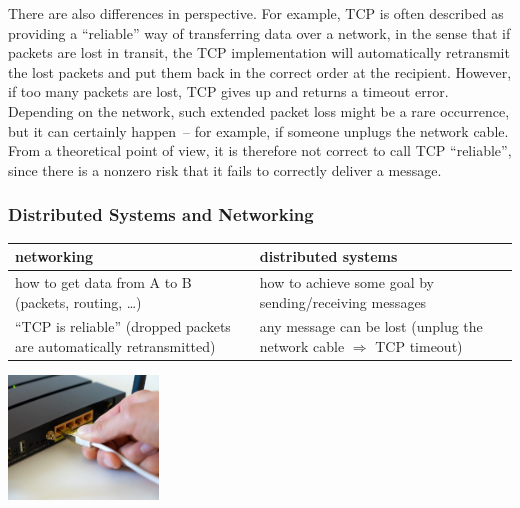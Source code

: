 There are also differences in perspective.
For example, TCP is often described as providing a ``reliable'' way of transferring data over a network, in the sense that if packets are lost in transit, the TCP implementation will automatically retransmit the lost packets and put them back in the correct order at the recipient.
However, if too many packets are lost, TCP gives up and returns a timeout error.
Depending on the network, such extended packet loss might be a rare occurrence, but it can certainly happen~-- for example, if someone unplugs the network cable.
From a theoretical point of view, it is therefore not correct to call TCP ``reliable'', since there is a nonzero risk that it fails to correctly deliver a message.

\begin{frame}
    \label{s:networking2}
    \frametitle{Distributed Systems and Networking}
    \renewcommand{\arraystretch}{1.3}
    \begin{tabular}{p{5cm}|p{5cm}}
        \hline
        \textbf{networking} & \textbf{distributed systems} \\\hline
        how to get data from A to B \newline (packets, routing, \dots) & how to achieve some goal by sending/receiving messages \pause\\
        ``TCP is reliable'' \newline (dropped packets are automatically retransmitted) & any message can be lost \newline (unplug the network cable \newline$\Rightarrow$ TCP timeout) \\\hline
    \end{tabular}
    \begin{center}
        \includegraphics[width=4cm]{images/network-cable.jpg}
    \end{center}
\end{frame}
\label{l:networking2}

